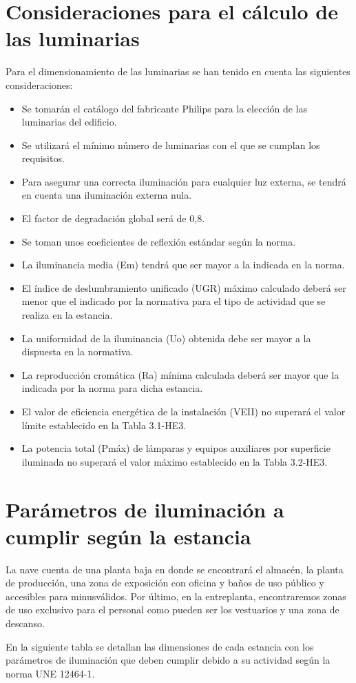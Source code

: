 \documentclass[../main.tex]{subfiles}
\begin{document}
\section{Consideraciones para el cálculo de las luminarias}
Para el dimensionamiento de las luminarias se han tenido en cuenta las siguientes consideraciones:

\begin{itemize}
    \item Se tomarán el catálogo del fabricante Philips para la elección de las luminarias del edificio.
    \item Se utilizará el mínimo número de luminarias con el que se cumplan los requisitos.
    \item Para asegurar una correcta iluminación para cualquier luz externa, se tendrá en cuenta una iluminación externa nula.
    \item El factor de degradación global será de 0,8.
    \item Se toman unos coeficientes de reflexión estándar según la norma.
    \item La iluminancia media (Em) tendrá que ser mayor a la indicada en la norma.
    \item El índice de deslumbramiento unificado (UGR) máximo calculado deberá ser menor que el indicado por la normativa para el tipo de actividad que se realiza en la estancia.
    \item La uniformidad de la iluminancia (Uo) obtenida debe ser mayor a la dispuesta en la normativa.
    \item La reproducción cromática (Ra) mínima calculada deberá ser mayor que la indicada por la norma para dicha estancia.
    \item El valor de eficiencia energética de la instalación (VEII) no superará el valor límite establecido en la Tabla 3.1-HE3.
    \item La potencia total (Pmáx) de lámparas y equipos auxiliares por superficie iluminada no superará el valor máximo establecido en la Tabla 3.2-HE3.
\end{itemize}

\section{Parámetros de iluminación a cumplir según la estancia}
La nave cuenta de una planta baja en donde se encontrará el almacén, la planta de producción, una zona de exposición con oficina y baños de uso público y accesibles para minusválidos. Por último, en la entreplanta, encontraremos zonas de uso exclusivo para el personal como pueden ser los vestuarios y una zona de descanso.\par
\vspace{0.5 cm}
En la siguiente tabla se detallan las dimensiones de cada estancia con los parámetros de iluminación que deben cumplir debido a su actividad según la norma UNE 12464-1. 
\end{document}
